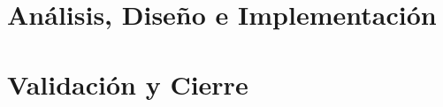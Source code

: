 \documentclass{pclass}
\begin{document}
\part{Análisis, Diseño e Implementación}

     
     
     
     
     
     

\part{Validación y Cierre}

     
     
     
     
     

\backmatter



\clearpage


\end{document}
